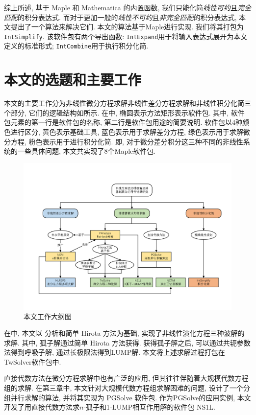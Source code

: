 综上所述, 基于 Maple 和 Mathematica 的内置函数, 我们只能化简\emph{线性可约}且\emph{完全匹配}的积分表达式. 而对于更加一般的\emph{线性不可约}且\emph{非完全匹配}的积分表达式, 本文提出了一个算法来解决它们. 本文的算法基于Maple进行实现. 我们将其打包为\texttt{IntSimplify}. 该软件包有两个导出函数: \texttt{IntExpand}用于将输入表达式展开为本文定义的标准形式; \texttt{IntCombine}用于执行积分化简. 

\section{本文的选题和主要工作}
本文的主要工作分为非线性微分方程求解\zdh 非线性差分方程求解和非线性积分化简三个部分, 它们的逻辑结构如所示. 在中, 椭圆表示方法\zdh 矩形表示软件包. 其中, 软件包元素的第一行是软件包的名称, 第二行是软件包用途的简要说明. 软件包以4种颜色进行区分, 黄色表示基础工具, 蓝色表示用于求解差分方程, 绿色表示用于求解微分方程, 粉色表示用于进行积分化简. 即, 对于微分\zdh 差分\zdh 积分这三种不同的非线性系统的一些具体问题, 本文共实现了8个Maple软件包.

\begin{figure}[htbp]
\includegraphics[width=\textwidth]{fig/outline.pdf}
\caption{本文工作大纲图}\label{outline}
\end{figure}

在中, 本文以 \Painleve{} 分析和简单 Hirota 方法为基础, 实现了非线性演化方程三种波解的求解. 其中, 孤子解通过简单 Hirota 方法获得. 获得孤子解之后, 可以通过共轭参数法得到呼吸子解, 通过长极限法得到LUMP解. 本文将上述求解过程打包在TwSolver软件包中.

直接代数方法在微分方程求解中也有广泛的应用, 但其往往伴随着大规模代数方程组的求解. 在第三章中, 本文针对大规模代数方程组求解困难的问题, 设计了一个分组并行求解的算法, 并将其实现为 PGSolve 软件包. 作为PGSolve的应用实例, 本文开发了用直接代数方法求$n$-孤子和1-LUMP相互作用解的软件包 NS1L. 


